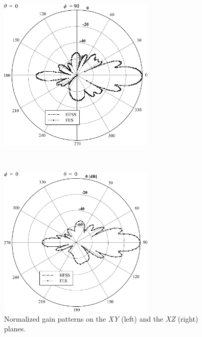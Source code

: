 \begin{figure}[h!]
\centering
\begin{minipage}{6.5cm}
\includegraphics[width=7.4cm]{Polar2}
\end{minipage}
\
\begin{minipage}{6.5cm}
\includegraphics[width=7.4cm]{Polar1}
\end{minipage}
\caption{Normalized gain patterns on the \textit{XY} (left) and the \textit{XZ} (right) planes.}
\label{fig:Polar}
\end{figure}



%
%

